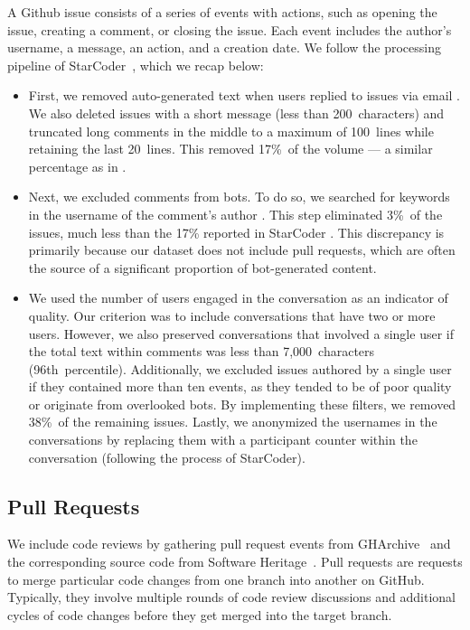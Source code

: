 \documentclass[10pt]{article} %
\begin{document}
A Github issue consists of a series of events with actions, such as opening the issue, creating a comment, or closing the issue. Each event includes the author’s username, a message, an action, and a creation date. We follow the processing pipeline of StarCoder~\citep{li2023starcoder}, which we recap below:
\begin{itemize}
\item First, we removed auto-generated text when users replied to issues via email \citep[for more information, see][Appendix A]{li2023starcoder}. We also deleted issues with a short message (less than 200~characters) and truncated long comments in the middle to a maximum of 100~lines while retaining the last 20~lines. This removed 17\%~of the volume --- a similar percentage as in \starcoderbase{}.

\item Next, we excluded comments from bots. To do so, we searched for keywords in the username of the comment's author \citep[for more information, see][Appendix A]{li2023starcoder}. This step eliminated 3\%~of the issues, much less than the 17\% reported in StarCoder \citep{li2023starcoder}. This discrepancy is primarily because our dataset does not include pull requests, which are often the source of a significant proportion of bot-generated content. 

\item We used the number of users engaged in the conversation as an indicator of quality. Our criterion was to include conversations that have two or more users. However, we also preserved conversations that involved a single user if the total text within comments was less than 7,000~characters (96th~percentile). Additionally, we excluded issues authored by a single user if they contained more than ten events, as they tended to be of poor quality or originate from overlooked bots. By implementing these filters, we removed 38\%~of the remaining issues. Lastly, we anonymized the usernames in the conversations by replacing them with a participant counter within the conversation (following the process of StarCoder). 
\end{itemize}

\subsection{Pull Requests}\label{sec:source_pull_requests}
We include code reviews by gathering pull request events from GHArchive~\citep{gharchive} and the corresponding source code from Software Heritage~\citep{swh}. Pull requests are requests to merge particular code changes from one branch into another on GitHub. Typically, they involve multiple rounds of code review discussions and additional cycles of code changes before they get merged into the target branch.
\end{document}

